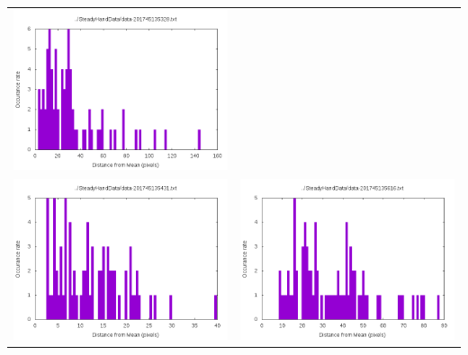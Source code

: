 \documentclass[12pt,letterpaper]{article}
\begin{document}
\begin{table}
\begin{tabular}{cc}
\includegraphics[scale=.5]{graph-data-201745135328.png}\\
\includegraphics[scale=.5]{graph-data-201745135431.png} &
\includegraphics[scale=.5]{graph-data-201745135616.png}\\
\end{tabular}
\end{table}
\end{document}
